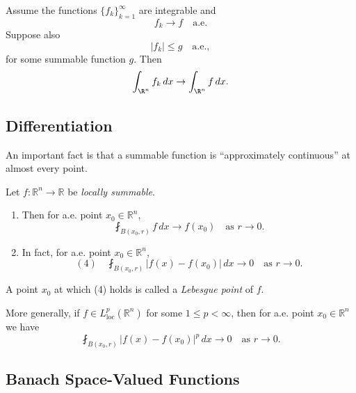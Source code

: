 \begin{theorem}
\label{thm:dominated-convergence-theorem}
Assume the functions $\{f_k\}_{k=1}^{\infty}$ are integrable and
$$f_k \to f \quad \text{a.e.}$$
Suppose also
$$|f_k| \leq g \quad \text{a.e.},$$
for some summable function $g$. Then
$$\int_{\R^n} f_k \, dx \to \int_{\R^n} f \, dx.$$
\end{theorem}

\subsection{Differentiation}
\label{sec:differentiation}

An important fact is that a summable function is ``approximately continuous'' at almost every point.

\begin{theorem}
\label{thm:lebesgue-differentiation-theorem}
Let $f : \mathbb{R}^n \to \mathbb{R}$ be \textit{locally summable}.

\begin{enumerate}
\item[(i)] Then for a.e. point $x_0 \in \mathbb{R}^n$,
$$\fint_{B(x_0,r)} f \, dx \to f(x_0) \quad \text{as } r \to 0.$$
\item[(ii)] In fact, for a.e. point $x_0 \in \mathbb{R}^n$,
$$(4) \quad \fint_{B(x_0,r)} |f(x) - f(x_0)| \, dx \to 0 \quad \text{as } r \to 0.$$
\end{enumerate}

A point $x_0$ at which (4) holds is called a \textit{Lebesgue point} of $f$.
\end{theorem}

\begin{remark}
\label{rem:lebesgue-differentiation-lp}
More generally, if $f \in L^p_{\text{loc}}(\mathbb{R}^n)$ for some $1 \le p < \infty$, then for a.e. point $x_0 \in \mathbb{R}^n$ we have
$$\fint_{B(x_0,r)} |f(x) - f(x_0)|^p \, dx \to 0 \quad \text{as } r \to 0.$$
\end{remark}

\subsection{Banach Space-Valued Functions}
\label{sec:banach-space-valued-functions}

